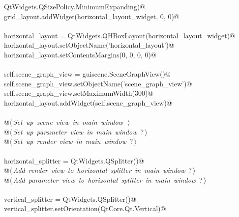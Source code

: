 \documentclass[
    a4paper,      %
    10pt,         %
    openright,    %
    notitlepage,  %
    parskip=half, %
]{scrreprt}       %
\theoremstyle{definition}                    %
\begin{document}
\begin{flushleft}
\begin{minipage}{\linewidth}
\begin{list}{}{}
\mbox{}\lstinline@    QtWidgets.QSizePolicy.MinimumExpanding)@\\
\mbox{}\lstinline@    grid_layout.addWidget(horizontal_layout_widget, 0, 0)@\\
\mbox{}\lstinline@@\\
\mbox{}\lstinline@    horizontal_layout = QtWidgets.QHBoxLayout(horizontal_layout_widget)@\\
\mbox{}\lstinline@    horizontal_layout.setObjectName('horizontal_layout')@\\
\mbox{}\lstinline@    horizontal_layout.setContentsMargins(0, 0, 0, 0)@\\
\mbox{}\lstinline@@\\
\mbox{}\lstinline@    self.scene_graph_view = guiscene.SceneGraphView()@\\
\mbox{}\lstinline@    self.scene_graph_view.setObjectName('scene_graph_view')@\\
\mbox{}\lstinline@    self.scene_graph_view.setMaximumWidth(300)@\\
\mbox{}\lstinline@    horizontal_layout.addWidget(self.scene_graph_view)@\\
\mbox{}\lstinline@@\\
\mbox{}\lstinline@    @\hbox{$\langle\,${\itshape Set up scene view in main window}\nobreak\ {\footnotesize {}}$\,\rangle$}\lstinline@@\\
\mbox{}\lstinline@    @\hbox{$\langle\,${\itshape Set up parameter view in main window}\nobreak\ {\footnotesize ?}$\,\rangle$}\lstinline@@\\
\mbox{}\lstinline@    @\hbox{$\langle\,${\itshape Set up render view in main window}\nobreak\ {\footnotesize ?}$\,\rangle$}\lstinline@@\\
\mbox{}\lstinline@@\\
\mbox{}\lstinline@     horizontal_splitter = QtWidgets.QSplitter()@\\
\mbox{}\lstinline@    @\hbox{$\langle\,${\itshape Add render view to horizontal splitter in main window}\nobreak\ {\footnotesize ?}$\,\rangle$}\lstinline@@\\
\mbox{}\lstinline@    @\hbox{$\langle\,${\itshape Add parameter view to horizontal splitter in main window}\nobreak\ {\footnotesize ?}$\,\rangle$}\lstinline@@\\
\mbox{}\lstinline@@\\
\mbox{}\lstinline@     vertical_splitter = QtWidgets.QSplitter()@\\
\mbox{}\lstinline@    vertical_splitter.setOrientation(QtCore.Qt.Vertical)@\\

\end{list}
\end{minipage}
\end{flushleft}
\end{document}
